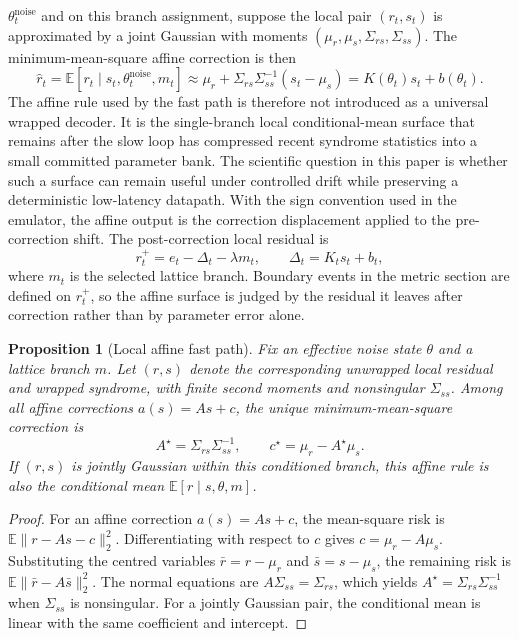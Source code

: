 \documentclass[11pt]{article}
\newtheorem{proposition}{Proposition}
\begin{document}
\(\theta_t^{\mathrm{noise}}\) and on this branch assignment, suppose the local
pair \((r_t,s_t)\) is approximated by a joint Gaussian with moments
\((\mu_r,\mu_s,\Sigma_{rs},\Sigma_{ss})\).  The minimum-mean-square affine
correction is then
\begin{equation}
    \hat r_t
    =\mathbb{E}[r_t\mid s_t,\theta_t^{\mathrm{noise}},m_t]
    \approx \mu_r+\Sigma_{rs}\Sigma_{ss}^{-1}(s_t-\mu_s)
    = K(\theta_t)s_t+b(\theta_t).
\end{equation}
The affine rule used by the fast path is therefore not introduced as a
universal wrapped decoder.  It is the single-branch local conditional-mean
surface that remains after the slow loop has compressed recent syndrome
statistics into a small committed parameter bank.  The scientific question in
this paper is whether such a surface can remain useful under controlled drift
while preserving a deterministic low-latency datapath.
With the sign convention used in the emulator, the affine output is the
correction displacement applied to the pre-correction shift.  The post-correction
local residual is
\begin{equation}
    r_t^{+}=e_t-\Delta_t-\lambda m_t,\qquad
    \Delta_t=K_t s_t+b_t ,
    \label{eq:post-correction-residual}
\end{equation}
where \(m_t\) is the selected lattice branch.  Boundary events in the metric
section are defined on \(r_t^{+}\), so the affine surface is judged by the
residual it leaves after correction rather than by parameter error alone.

\begin{proposition}[Local affine fast path]
Fix an effective noise state \(\theta\) and a lattice branch \(m\).  Let
\((r,s)\) denote the corresponding unwrapped local residual and wrapped
syndrome, with finite second moments and nonsingular \(\Sigma_{ss}\).  Among
all affine corrections \(a(s)=As+c\), the unique minimum-mean-square
correction is
\[
    A^\star=\Sigma_{rs}\Sigma_{ss}^{-1},\qquad
    c^\star=\mu_r-A^\star\mu_s .
\]
If \((r,s)\) is jointly Gaussian within this conditioned branch, this affine
rule is also the conditional mean \(\mathbb{E}[r\mid s,\theta,m]\).
\end{proposition}

\begin{proof}
For an affine correction \(a(s)=As+c\), the mean-square risk is
\(\mathbb{E}\|r-As-c\|_2^2\).  Differentiating with respect to \(c\) gives
\(c=\mu_r-A\mu_s\).  Substituting the centred variables
\(\bar r=r-\mu_r\) and \(\bar s=s-\mu_s\), the remaining risk is
\(\mathbb{E}\|\bar r-A\bar s\|_2^2\).  The normal equations are
\(A\Sigma_{ss}=\Sigma_{rs}\), which yields
\(A^\star=\Sigma_{rs}\Sigma_{ss}^{-1}\) when \(\Sigma_{ss}\) is nonsingular.
For a jointly Gaussian pair, the conditional mean is linear with the same
coefficient and intercept.
\end{proof}
\end{document}
